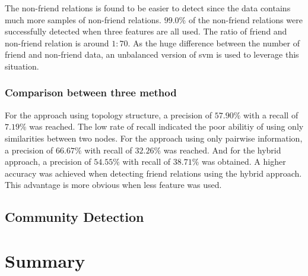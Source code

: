 \documentclass[11pt]{article}
\begin{document}

The non-friend relations is found to be easier to detect since the data contains much more samples of non-friend relations. $99.0\%$ of the non-friend relations were successfully detected when three features are all used. The ratio of friend and non-friend relation is around $1:70$. As the huge difference between the number of friend and non-friend data, an unbalanced version of svm is used to leverage this situation.

\subsubsection{Comparison between three method}
For the approach using topology structure, a precision of $57.90\%$ with a recall of $7.19\%$ was reached. The low rate of recall indicated the poor abilitiy of using only similarities between two nodes. For the approach using only pairwise information, a precision of $66.67\%$ with recall of $32.26\%$ was reached. And for the hybrid approach, a precision of $54.55\%$ with recall of $38.71\%$ was obtained. A higher accuracy was achieved when detecting friend relations using the hybrid approach. This advantage is more obvious when less feature was used. 
 
\subsection{Community Detection}

\section{Summary}\label{summary}



%

\end{document}
